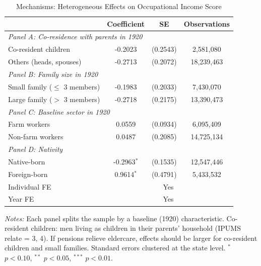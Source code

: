 \begin{table}[H]
\centering
\caption{Mechanisms: Heterogeneous Effects on Occupational Income Score}
\label{tab:mechanisms}
\begin{threeparttable}
\begin{tabular}{lccc}
\toprule
 & Coefficient & SE & Observations \\
\midrule
\multicolumn{4}{l}{\textit{Panel A: Co-residence with parents in 1920}} \\
Co-resident children & -0.2023 & (0.2543) & 2,581,080 \\
Others (heads, spouses) & -0.2713 & (0.2072) & 18,239,463 \\
\midrule
\multicolumn{4}{l}{\textit{Panel B: Family size in 1920}} \\
Small family ($\leq$ 3 members) & -0.1983 & (0.2033) & 7,430,070 \\
Large family ($>$ 3 members) & -0.2718 & (0.2175) & 13,390,473 \\
\midrule
\multicolumn{4}{l}{\textit{Panel C: Baseline sector in 1920}} \\
Farm workers & 0.0559 & (0.0934) & 6,095,409 \\
Non-farm workers & 0.0487 & (0.2085) & 14,725,134 \\
\midrule
\multicolumn{4}{l}{\textit{Panel D: Nativity}} \\
Native-born & -0.2963$^{*}$ & (0.1535) & 12,547,446 \\
Foreign-born & 0.9614$^{*}$ & (0.4791) & 5,433,532 \\
\midrule
Individual FE & \multicolumn{3}{c}{Yes} \\
Year FE & \multicolumn{3}{c}{Yes} \\
\bottomrule
\end{tabular}
\begin{tablenotes}[flushleft]\small
\item \textit{Notes:} Each panel splits the sample by a baseline (1920) characteristic. Co-resident children: men living as children in their parents' household (IPUMS relate = 3, 4). If pensions relieve eldercare, effects should be larger for co-resident children and small families. Standard errors clustered at the state level. $^{*}$ $p<0.10$, $^{**}$ $p<0.05$, $^{***}$ $p<0.01$.
\end{tablenotes}
\end{threeparttable}
\end{table}

